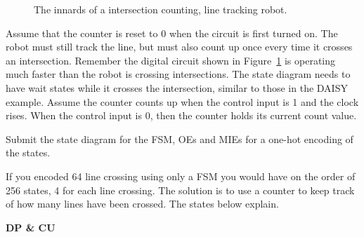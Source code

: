 \begin{enumerate}
\begin{figure}[ht]
\caption{The innards of a intersection counting, line tracking robot.}
\label{fig:linecounter}
\end{figure}

Assume that the counter is reset to 0 when the circuit
is first turned on.  The robot must still track the line, but
must also count up once every time it crosses an intersection.  Remember
the digital circuit shown in Figure~\ref{fig:linecounter} is
operating much faster than the robot is crossing intersections.
The state diagram needs to have wait states while it crosses
the intersection, similar to those
in the DAISY example.  Assume the counter counts up
when the control input is 1 and the clock rises.  When the control
input is 0, then the counter holds its current count value.

Submit the state diagram for the FSM, OEs and MIEs for a one-hot 
encoding of the states.  

\begin{solution} {
\pagebreak
If you encoded 64 line crossing using only a FSM you would have
on the order of 256 states, 4 for each line crossing.  The solution
is to use a counter to keep track of how many lines have been crossed.
The states below explain.

{\bf DP \& CU}

\begin{figure}[ht]
\end{figure}

}
\end{solution}
\end{enumerate}
